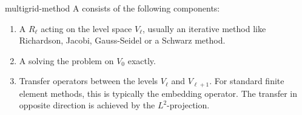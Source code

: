 \begin{Definition}{multigrid-method}
  A  consists of the following components:
  \begin{enumerate}
  \item A  $R_\ell$ acting on the level space
    $V_\ell$, usually an iterative method like Richardson, Jacobi,
    Gauss-Seidel or a Schwarz method.
  \item A  solving the problem on $V_0$
    exactly.
  \item Transfer operators between the levels $V_{\ell}$ and
    $V_{\ell+1}$. For standard finite element methods, this is
    typically the embedding operator. The transfer in opposite
    direction is achieved by the $L^2$-projection.
  \end{enumerate}
  

\end{Definition}
